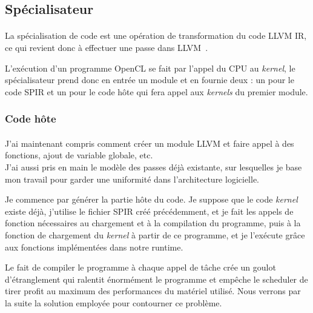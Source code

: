\subsection{Spécialisateur}
\paragraph{}
La spécialisation de code est une opération de transformation du code LLVM IR,
ce qui revient donc à effectuer une passe dans LLVM~\cite{llvm_pass}.

L'exécution d'un programme OpenCL se fait par l'appel du CPU au \emph{kernel},
le spécialisateur prend donc en entrée un module et en fournie deux : un pour
le code SPIR et un pour le code hôte qui fera appel aux \emph{kernels} du
premier module.

\subsubsection{Code hôte}
\paragraph{}
J'ai maintenant compris comment créer un module LLVM et faire appel à des
fonctions, ajout de variable globale, etc.\\
J'ai aussi pris en main le modèle des passes déjà existante, sur lesquelles je
base mon travail pour garder une uniformité dans l'architecture logicielle.

Je commence par générer la partie hôte du code. Je suppose que le code
\emph{kernel} existe déjà, j'utilise le fichier SPIR créé précédemment, et je
fait les appels de fonction nécessaires au chargement et à la compilation du
programme, puis à la fonction de chargement du \emph{kernel} à partir de ce
programme, et je l'exécute grâce aux fonctions implémentées dans notre runtime.

Le fait de compiler le programme à chaque appel de tâche crée un goulot
d'étranglement qui ralentit énormément le programme et empêche le scheduler de
tirer profit au maximum des performances du matériel utilisé. Nous verrons par
la suite la solution employée pour contourner ce problème.

